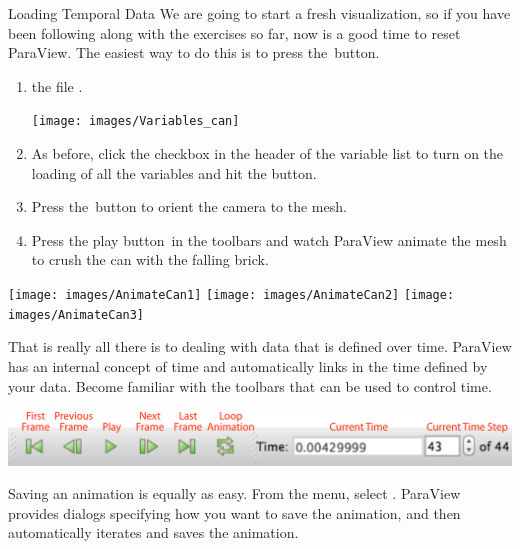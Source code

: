 \begin{exercise}{Loading Temporal Data}
  \label{ex:LoadingTemporalData}%
  We are going to start a fresh visualization, so if you have been
  following along with the exercises so far, now is a good time to reset
  ParaView.  The easiest way to do this is to press the~\disconnect button.

  \begin{enumerate}
  \item {}  the file .
    \begin{inlinefig}
      \texttt{[image: images/Variables\_can]}
    \end{inlinefig}
  \item As before, click the checkbox in the header of the variable list to
    turn on the loading of all the variables and hit the \apply button.
  \item Press the~\yPlus button to orient the camera to the mesh.
  \item Press the play button~\vcrPlay in the toolbars and watch ParaView
    animate the mesh to crush the can with the falling brick.
  \end{enumerate}

  \begin{inlinefig}
    \texttt{[image: images/AnimateCan1]}
    \texttt{[image: images/AnimateCan2]}
    \texttt{[image: images/AnimateCan3]}
  \end{inlinefig}
\end{exercise}

That is really all there is to dealing with data that is defined over time.
ParaView has an internal concept of time and automatically links in the
time defined by your data.  Become familiar with the toolbars that can be
used to control time.

\begin{inlinefig}
  \includegraphics[width=\linewidth]{images/AnimationToolbar}
\end{inlinefig}

Saving an animation is equally as easy.  From the menu, select 
\ra {}.  ParaView provides dialogs specifying how you
want to save the animation, and then automatically iterates and saves the
animation.

